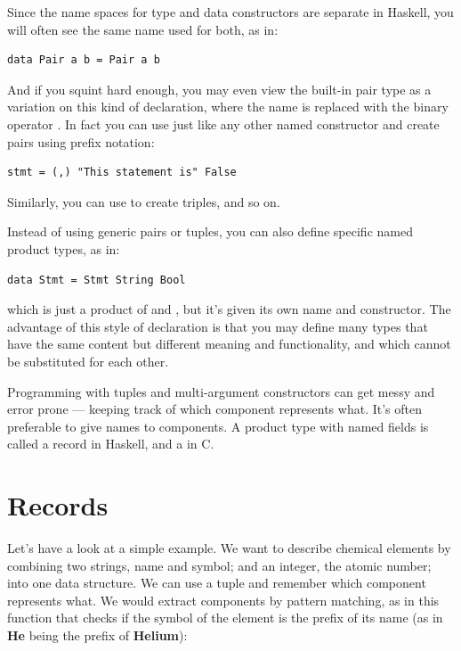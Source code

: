 Since the name spaces for type and data constructors are separate in
Haskell, you will often see the same name used for both, as in:

\begin{verbatim}
data Pair a b = Pair a b
\end{verbatim}

\noindent
And if you squint hard enough, you may even view the built-in pair type
as a variation on this kind of declaration, where the name 
is replaced with the binary operator \code{(,)}. In fact you can use
\code{(,)} just like any other named constructor and create pairs
using prefix notation:

\begin{verbatim}
stmt = (,) "This statement is" False
\end{verbatim}

\noindent
Similarly, you can use \code{(,,)} to create triples, and so on.

Instead of using generic pairs or tuples, you can also define specific
named product types, as in:

\begin{verbatim}
data Stmt = Stmt String Bool
\end{verbatim}

\noindent
which is just a product of  and , but it's
given its own name and constructor. The advantage of this style of
declaration is that you may define many types that have the same content
but different meaning and functionality, and which cannot be substituted
for each other.

Programming with tuples and multi-argument constructors can get messy
and error prone --- keeping track of which component represents what.
It's often preferable to give names to components. A product type with
named fields is called a record in Haskell, and a  in C.

\section{Records}\label{records}

Let's have a look at a simple example. We want to describe chemical
elements by combining two strings, name and symbol; and an integer, the
atomic number; into one data structure. We can use a tuple
 and remember which component represents
what. We would extract components by pattern matching, as in this
function that checks if the symbol of the element is the prefix of its
name (as in \textbf{He} being the prefix of \textbf{Helium}):

